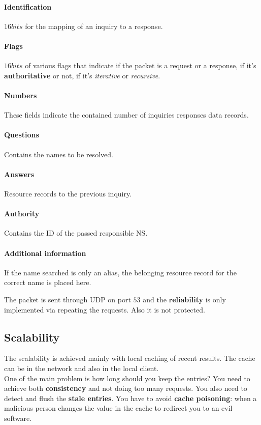 \paragraph{Identification} $16bits$ for the mapping of an inquiry to a response.
\paragraph{Flags} $16bits$ of various flags that indicate if the packet is a request or a response, if it's \textbf{authoritative} or not, if it's \textit{iterative} or \textit{recursive}.
\paragraph{Numbers} These fields indicate the contained number of inquiries responses data records.
\paragraph{Questions} Contains the names to be resolved.
\paragraph{Answers} Resource records to the previous inquiry.
\paragraph{Authority} Contains the ID of the passed responsible NS.
\paragraph{Additional information} If the name searched is only an alias, the belonging resource record for the correct name is placed here.

The packet is sent through UDP on port $53$ and the \textbf{reliability} is only implemented via repeating the requests. Also it is not protected.

\subsection{Scalability}
The scalability is achieved mainly with local caching of recent results. The cache can be in the network and also in the local client.\\
One of the main problem is how long should you keep the entries? You need to achieve both \textbf{consistency} and not doing too many requests. You also need to detect and flush the \textbf{stale entries}. You have to avoid \textbf{cache poisoning}: when a malicious person changes the value in the cache to redirect you to an evil software.
